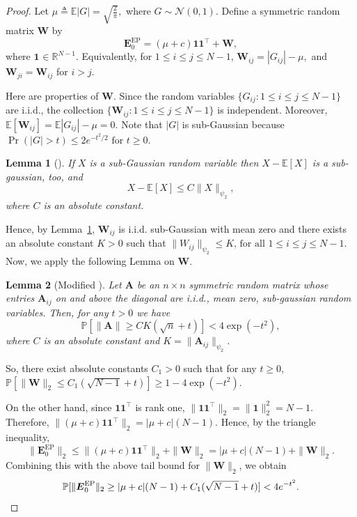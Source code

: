 \documentclass[lettersize,journal]{IEEEtran}
\newcommand{\ones}[1]{\boldsymbol{1}_{#1}}
\newcommand{\GEP}{\boldsymbol{E}^{\mathrm{EP}}}
\newcommand{\gaussian}[2]{\mathcal{N}(#1, #2)}
\newcommand{\RR}{\mathbb{R}}
\newcommand{\prob}[1]{\mathbb{P}\left[#1\right]}
\newcommand{\ex}[1]{\mathbb{E}\left[#1\right]}
\newcommand{\psitwo}[1]{\|#1\|_{\psi_2} }
\newtheorem{lemma}{Lemma}
\begin{document}
{\label{proof of lem:norm-of-matrices-with-standard-gaussian-entries}
\begin{proof}
Let $\mu \triangleq \mathbb E|G|=\sqrt{\frac{2}{\pi}},$
where $G\sim\gaussian{0}{1}$. Define a symmetric random matrix $\boldsymbol W$ by
\[
\GEP_0= (\mu+c)\mathbf 1\mathbf 1^\top + \boldsymbol W,
\]
where $\ones{}\in \RR^{N-1}$. Equivalently, for $1\le i\le j\le N-1$,
$\boldsymbol{W}_{ij}=|G_{ij}|-\mu,$
and $\boldsymbol{W}_{ji}=\boldsymbol{W}_{ij}$ for $i>j$.

Here are properties of $\boldsymbol W$. Since the random variables $\{G_{ij}:1\le i\le j\le N-1\}$ are i.i.d., the collection $\{\boldsymbol{W}_{ij}:1\le i\le j\le N-1\}$
is independent. Moreover,
$\mathbb E[\boldsymbol{W}_{ij}]
=
\mathbb E|G_{ij}|-\mu
=
0.$
Note that $|G|$ is sub-Gaussian because $\Pr(|G|>t)\le 2e^{-t^2/2}\text{ for } t\ge 0$.
\begin{lemma}[{\cite[Lemma 2.6.8]{vershynin2020high}}]
\label{lem:centering-sug-gaussian}
    If $X$ is a sub-Gaussian random variable then $X - \ex{X}$ is a sub-gaussian, too, and
    \[
        X -\ex{X} \leq C\psitwo{X},
    \]
    where $C$ is an absolute constant.
\end{lemma}
Hence, by Lemma~\ref{lem:centering-sug-gaussian}, $\boldsymbol{W}_{ij}$ is i.i.d. sub-Gaussian with mean zero and
there exists an absolute constant $K>0$ such that
$\|W_{ij}\|_{\psi_2}\le K\text{, for all }1\le i\le j\le N-1.$
Now, we apply the following Lemma on $\boldsymbol{W}$.
\begin{lemma}[Modified {\cite[Corollary 4.4.8]{vershynin2020high}}]
    Let $\boldsymbol{A}$ be an $n\times n$ symmetric random matrix whose entries $\boldsymbol{A}_{ij}$ on and above the diagonal are i.i.d., mean zero, sub-gaussian random variables. Then, for any $t> 0$ we have
    \[
    \prob{\|\boldsymbol{A}\|\geq CK(\sqrt{n} + t)}< 4\exp(-t^2),
    \]
    where $C$ is an absolute constant and $K = \psitwo{\boldsymbol{A}_{ij}}$.
\end{lemma}
So, there exist absolute constants $C_1>0$ such that for any $t\ge 0$, 
$\prob{\|\boldsymbol W\|_2 \leq C_1(\sqrt{N-1} + t)}
\geq 1- 4\exp(-t^2).$ 

On the other hand, since $\mathbf 1\mathbf 1^\top$ is rank one, $\|\mathbf 1\mathbf 1^\top\|_2=\|\mathbf 1\|_2^2=N-1.$ Therefore, $\|(\mu+c)\mathbf 1\mathbf 1^\top\|_2 = |\mu+c|(N-1).$ 
Hence, by the triangle inequality,
\[
\|\GEP_0\|_2
\le
\|(\mu+c)\mathbf 1\mathbf 1^\top\|_2 + \|\boldsymbol W\|_2
=
|\mu+c|(N-1)+\|\boldsymbol W\|_2.
\]
Combining this with the above tail bound for $\|\boldsymbol W\|_2$, we obtain
\[
\mathbb{P}[
\|\GEP_0\|_2
\geq
|\mu+c|(N-1) + C_1(\sqrt{N-1}+t)
]
< 4e^{-t^2}.\qedhere
\]
\end{proof}

}
\end{document}

